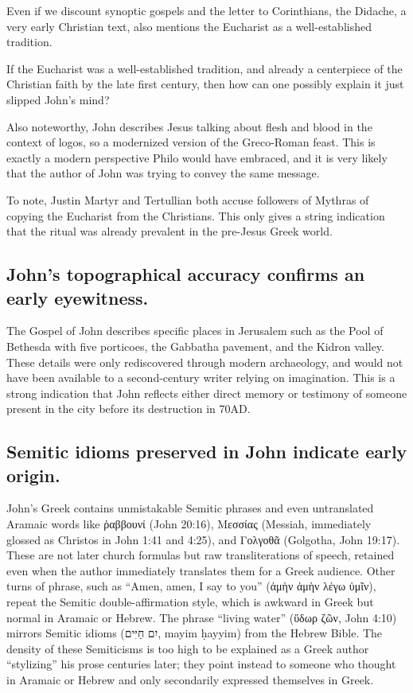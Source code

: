 Even if we discount synoptic gospels and the letter to Corinthians, the Didache, a very early Christian text, also mentions the Eucharist as a well-established tradition.

If the Eucharist was a well-established tradition, and already a centerpiece of the Christian faith by the late first century, then how can one possibly explain it just slipped John's mind?

Also noteworthy, John describes Jesus talking about flesh and blood in the context of logos, so a modernized version of the Greco-Roman feast.
This is exactly a modern perspective Philo would have embraced, and it is very likely that the author of John was trying to convey the same message.

To note, Justin Martyr and Tertullian both accuse followers of Mythras of copying the Eucharist from the Christians.
This only gives a string indication that the ritual was already prevalent in the pre-Jesus Greek world.

\subsection{John’s topographical accuracy confirms an early eyewitness.}\label{subsec:johns-topographical-accuracy-confirms-an-early-eyewitness.}

The Gospel of John describes specific places in Jerusalem such as the Pool of Bethesda with five porticoes, the Gabbatha pavement, and the Kidron valley.
These details were only rediscovered through modern archaeology, and would not have been available to a second-century writer relying on imagination.
This is a strong indication that John reflects either direct memory or testimony of someone present in the city before its destruction in 70AD.

\subsection{Semitic idioms preserved in John indicate early origin.}\label{subsec:semitic-idioms-preserved-in-john-indicate-early-origin.}

John’s Greek contains unmistakable Semitic phrases and even untranslated Aramaic words like ῥαββουνί (John 20:16), Μεσσίας (Messiah, immediately glossed as Christos in John 1:41 and 4:25), and Γολγοθᾶ (Golgotha, John 19:17).
These are not later church formulas but raw transliterations of speech, retained even when the author immediately translates them for a Greek audience.
Other turns of phrase, such as “Amen, amen, I say to you” (ἀμὴν ἀμὴν λέγω ὑμῖν), repeat the Semitic double-affirmation style, which is awkward in Greek but normal in Aramaic or Hebrew.
The phrase “living water” (ὕδωρ ζῶν, John 4:10) mirrors Semitic idioms (\texthebrew{יִם חַיִּים}, mayim ḥayyim) from the Hebrew Bible.
The density of these Semiticisms is too high to be explained as a Greek author “stylizing” his prose centuries later; they point instead to someone who thought in Aramaic or Hebrew and only secondarily expressed themselves in Greek.

